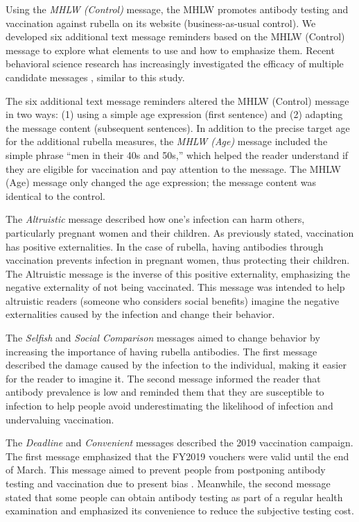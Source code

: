 \documentclass[
  11pt,
  a4paper
]{article}
\begin{document}
Using the \emph{MHLW (Control)} message, the MHLW promotes antibody testing and vaccination against rubella on its website (business-as-usual control). We developed six additional text message reminders based on the MHLW (Control) message to explore what elements to use and how to emphasize them. Recent behavioral science research has increasingly investigated the efficacy of multiple candidate messages \citep[e.g.,][]{Dai2021, Milkman2021}, similar to this study.

The six additional text message reminders altered the MHLW (Control) message in two ways: (1) using a simple age expression (first sentence) and (2) adapting the message content (subsequent sentences). In addition to the precise target age for the additional rubella measures, the \emph{MHLW (Age)} message included the simple phrase ``men in their 40s and 50s,'' which helped the reader understand if they are eligible for vaccination and pay attention to the message. The MHLW (Age) message only changed the age expression; the message content was identical to the control.

The \emph{Altruistic} message described how one's infection can harm others, particularly pregnant women and their children. As previously stated, vaccination has positive externalities. In the case of rubella, having antibodies through vaccination prevents infection in pregnant women, thus protecting their children. The Altruistic message is the inverse of this positive externality, emphasizing the negative externality of not being vaccinated. This message was intended to help altruistic readers (someone who considers social benefits) imagine the negative externalities caused by the infection and change their behavior.

The \emph{Selfish} and \emph{Social Comparison} messages aimed to change behavior by increasing the importance of having rubella antibodies. The first message described the damage caused by the infection to the individual, making it easier for the reader to imagine it. The second message informed the reader that antibody prevalence is low and reminded them that they are susceptible to infection to help people avoid underestimating the likelihood of infection and undervaluing vaccination.

The \emph{Deadline} and \emph{Convenient} messages described the 2019 vaccination campaign. The first message emphasized that the FY2019 vouchers were valid until the end of March. This message aimed to prevent people from postponing antibody testing and vaccination due to present bias \citep{ODonoghue2001}. Meanwhile, the second message stated that some people can obtain antibody testing as part of a regular health examination and emphasized its convenience to reduce the subjective testing cost.
\end{document}
